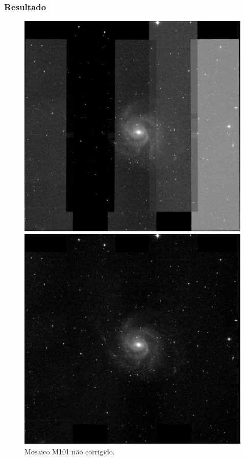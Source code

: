 \documentclass[red, cover=invisible, theme=Warsaw]{myslides}
\begin{document}
	
	\begin{frame} \frametitle{Resultado}
	    \begin{center}
		\begin{figure}[!htb]%
		    \begin{minipage}[b]{0.45\linewidth} %
			\centering
			\includegraphics[scale=0.35]{imagens/mosaico1.pdf}
			\caption{Mosaico M101 não corrigido.}
			\label{fig:Mosaico}
		    \end{minipage}
		    \hspace{0.1cm} %
		    \begin{minipage}[b]{0.45\linewidth}
			\centering
			\includegraphics[scale=0.35]{imagens/mosaico2.pdf} 

\end{minipage}
\end{figure}
\end{center}
\end{frame}
\end{document}
